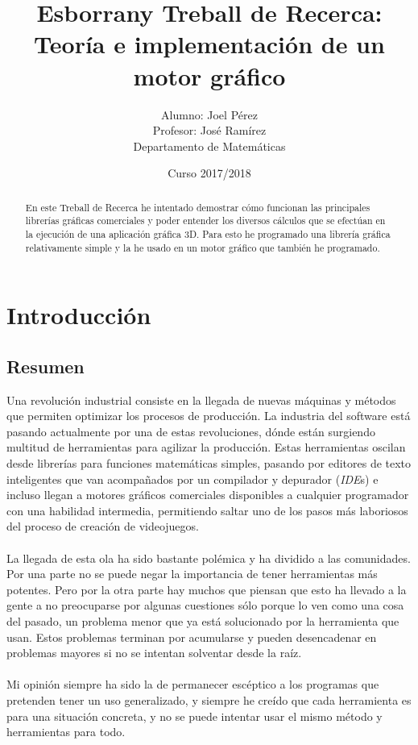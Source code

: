 \documentclass{report}
\title{Esborrany Treball de Recerca:\\Teoría e implementación de un motor gráfico}
\date{Curso 2017/2018}
\author{Alumno: Joel Pérez\\Profesor: José Ramírez\\Departamento de Matemáticas}
\begin{document}
\lstset{language=C, basicstyle=\ttfamily}

\maketitle


\newpage


\begin{abstract}
  En este Treball de Recerca he intentado demostrar cómo funcionan las principales librerías gráficas comerciales y poder entender los diversos cálculos que se efectúan en la ejecución de una aplicación gráfica 3D. Para esto he programado una librería gráfica relativamente simple y la he usado en un motor gráfico que también he programado.
\end{abstract}

\clearpage
\tableofcontents

\newpage
\chapter{Introducción}
\section{Resumen}
Una revolución industrial consiste en la llegada de nuevas máquinas y métodos que permiten optimizar los procesos de producción. La industria del software está pasando actualmente por una de estas revoluciones, dónde están surgiendo multitud de herramientas para agilizar la producción. Estas herramientas oscilan desde librerías para funciones matemáticas simples, pasando por editores de texto inteligentes que van acompañados por un compilador y depurador (\textit{IDE}s) e incluso llegan a motores gráficos comerciales disponibles a cualquier programador con una habilidad intermedia, permitiendo saltar uno de los pasos más laboriosos del proceso de creación de videojuegos.
\\\\
La llegada de esta ola ha sido bastante polémica y ha dividido a las comunidades. Por una parte no se puede negar la importancia de tener herramientas más potentes. Pero por la otra parte hay muchos que piensan que esto ha llevado a la gente a no preocuparse por algunas cuestiones sólo porque lo ven como una cosa del pasado, un problema menor que ya está solucionado por la herramienta que usan. Estos problemas terminan por acumularse y pueden desencadenar en problemas mayores si no se intentan solventar desde la raíz.
\\\\
Mi opinión siempre ha sido la de permanecer escéptico a los programas que pretenden tener un uso generalizado, y siempre he creído que cada herramienta es para una situación concreta, y no se puede intentar usar el mismo método y herramientas para todo.
\end{document}
